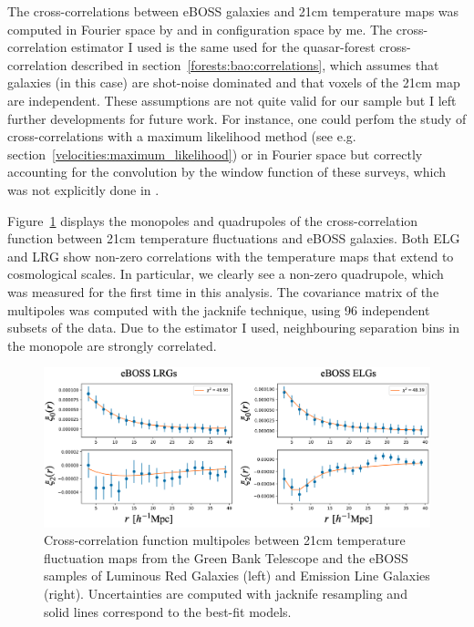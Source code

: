 The cross-correlations between eBOSS galaxies and 21cm temperature maps was computed 
in Fourier space by \cite{wolzConstraintsCrosscorrelationEBOSS2022} and in configuration space by me. 
The cross-correlation estimator I used is the same used for the quasar-\lya forest cross-correlation 
described in section~\ref{forests:bao:correlations}, which assumes that galaxies (in this case)
are shot-noise dominated and that voxels of the 21cm map are independent. These assumptions are 
not quite valid for our sample but I left further developments for future work. 
For instance, one could perfom 
the study of cross-correlations with a maximum likelihood method 
(see e.g. section~\ref{velocities:maximum_likelihood}) or in Fourier space but correctly accounting for 
the convolution by the window function of these surveys, which was not explicitly done in 
\cite{wolzConstraintsCrosscorrelationEBOSS2022}.

Figure~\ref{fig:gbt_cross_correlation} displays the monopoles and quadrupoles of the cross-correlation function 
between 21cm temperature fluctuations and eBOSS galaxies. Both ELG and LRG show non-zero correlations with the 
temperature maps that extend to cosmological scales. 
In particular, we clearly see a non-zero quadrupole, which was measured for the first time in this analysis.  
The covariance matrix of the multipoles was computed with the jacknife technique, 
using 96 independent subsets of the data. Due to the estimator I used, neighbouring separation bins in the 
monopole are strongly correlated. 

\begin{figure}
    \centering 
    \includegraphics[width=\textwidth]{fig/galaxies/gbt_mono_quad.png}
    \caption{Cross-correlation function multipoles between 21cm temperature fluctuation maps from the Green Bank Telescope 
    and the eBOSS samples of Luminous Red Galaxies (left) and Emission Line Galaxies (right). 
    Uncertainties are computed with jacknife resampling and solid lines correspond to the best-fit models. 
    }
    \label{fig:gbt_cross_correlation}
\end{figure}

